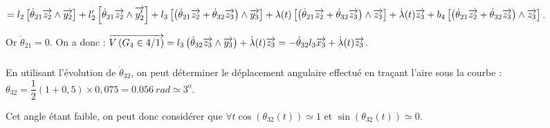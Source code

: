 \documentclass[10pt,fleqn]{article} %
\begin{document}
$= 
l_2\left[ \dot{\theta}_{21}\overrightarrow{z_2} \wedge \overrightarrow{y_2} \right]+
l_2'\left[ \dot{\theta}_{21}\overrightarrow{z_2} \wedge \overrightarrow{y_2'} \right]+
l_3\left[ \left(\dot{\theta}_{21}\overrightarrow{z_2}+\dot{\theta}_{32}\overrightarrow{z_3} \right) \wedge \overrightarrow{y_3} \right]+
\lambda(t)\left[ \left(\dot{\theta}_{21}\overrightarrow{z_2}+\dot{\theta}_{32}\overrightarrow{z_3} \right) \wedge \overrightarrow{z_3} \right]+
\dot{\lambda}(t)\overrightarrow{z_3}+
b_4\left[ \left(\dot{\theta}_{21}\overrightarrow{z_2}+\dot{\theta}_{32}\overrightarrow{z_3} \right) \wedge \overrightarrow{z_3} \right]$. 

Or $\dot{\theta}_{21}=0$. On a donc :
$\overrightarrow{V\left( {G_4} \in {4}/{1}\right)}= 
l_3\left(\dot{\theta}_{32}\overrightarrow{z_3} \wedge \overrightarrow{y_3} \right)+
\dot{\lambda}(t)\overrightarrow{z_3} =
-\dot{\theta}_{32}l_3\overrightarrow{x_3}  + \dot{\lambda}(t)\overrightarrow{z_3}$.

%
%
%
%
%
%



\subparagraph{}%
En utilisant l'évolution de $\dot{\theta}_{32}$, on peut déterminer le déplacement angulaire effectué en traçant l'aire sous la courbe :
$\theta_{32}=\dfrac{1}{2}\left( 1+0,5\right)\times 0,075 =\SI{0,056}{rad}\simeq 3^{\text{o}}$.

Cet angle étant faible, on peut donc considérer que $\forall t \cos \left(\theta_{32}(t)\right)\simeq 1$ et $\sin\left(\theta_{32}(t)\right)\simeq 0$.

\subparagraph{}%
\end{document}
